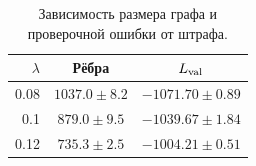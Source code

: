 \begin{table}[H]\centering
\small
\caption{Зависимость размера графа и проверочной ошибки от штрафа.}
\begin{tabular}{@{}rcc@{}}\toprule
$\lambda$ & Рёбра & $L_{\rm val}$ \\
\midrule
0.08 & $1037.0 \pm 8.2$ & $-1071.70 \pm 0.89$ \\
0.1 & $879.0 \pm 9.5$ & $-1039.67 \pm 1.84$ \\
0.12 & $735.3 \pm 2.5$ & $-1004.21 \pm 0.51$ \\
\bottomrule
\end{tabular}
\end{table}

